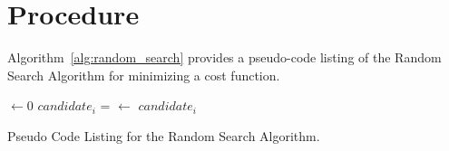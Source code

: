 \documentclass[a4paper, 11pt]{article}
\begin{document}
\section{Procedure}
\label{sec:procedure}
Algorithm~\ref{alg:random_search} provides a pseudo-code listing of the Random Search Algorithm for minimizing a cost function.

\begin{algorithm}[ht]
	\SetLine
	\KwIn{\NumIterations, \ProblemSize}
	\KwOut{\Best}
	\Best $\leftarrow 0$\;
	 {
		$candidate_i$ = \RandomSolution{\ProblemSize}\;
		 {
			\Best $\leftarrow$ $candidate_i$\;
		}
	}
	\Return{\Best}\;
	\caption{Pseudo Code Listing for the Random Search Algorithm.}
	\label{alg:random_search}
\end{algorithm}

\end{document}
